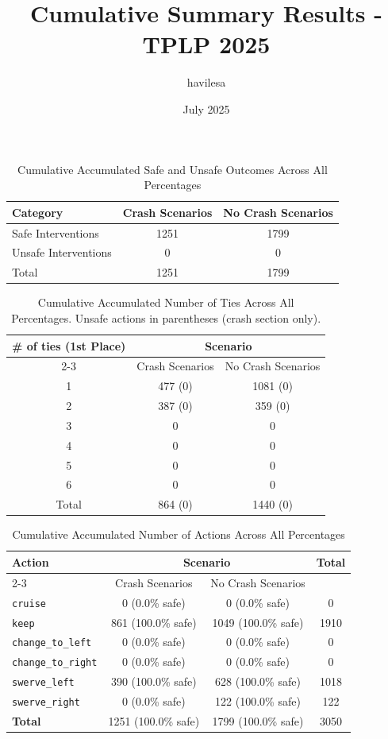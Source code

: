 \documentclass{article}
\title{Cumulative Summary Results - TPLP 2025}
\author{havilesa}
\date{July 2025}
\begin{document}
\maketitle

\begin{table}[h]
\centering
\caption{Cumulative Accumulated Safe and Unsafe Outcomes Across All Percentages}
\begin{tabular}{l|cc}
\toprule
Category & Crash Scenarios & No Crash Scenarios \\
\midrule
Safe Interventions & 1251 & 1799 \\ 
Unsafe Interventions & 0 & 0 \\ 
\midrule
Total & 1251 & 1799 \\ 
\bottomrule
\end{tabular}
\end{table}

\begin{table}[h]
\centering
\caption{Cumulative Accumulated Number of Ties Across All Percentages.
Unsafe actions in parentheses (crash section only).}
\begin{tabular}{c|cc}
\toprule
\multirow{2}{*}{\# of ties (1st Place)} & \multicolumn{2}{c|}{Scenario} \\
\cmidrule{2-3}
 & Crash Scenarios & No Crash Scenarios \\
\midrule
1 & 477 (0) & 1081 (0) \\ 
2 & 387 (0) & 359 (0) \\ 
3 & 0 & 0 \\ 
4 & 0 & 0 \\ 
5 & 0 & 0 \\ 
6 & 0 & 0 \\ 
\midrule
Total & 864 (0) & 1440 (0) \\ 
\bottomrule
\end{tabular}
\end{table}

\begin{table}[h]
\centering
\caption{Cumulative Accumulated Number of Actions Across All Percentages}
\begin{tabular}{l|cc|c}
\toprule
\multirow{2}{*}{Action} & \multicolumn{2}{c|}{Scenario} & \multirow{2}{*}{Total} \\
\cmidrule{2-3}
 & Crash Scenarios & No Crash Scenarios \\
\midrule
\texttt{cruise} & 0 (0.0\% safe) & 0 (0.0\% safe) & 0 \\ 
\texttt{keep} & 861 (100.0\% safe) & 1049 (100.0\% safe) & 1910 \\ 
\texttt{change\_to\_left} & 0 (0.0\% safe) & 0 (0.0\% safe) & 0 \\ 
\texttt{change\_to\_right} & 0 (0.0\% safe) & 0 (0.0\% safe) & 0 \\ 
\texttt{swerve\_left} & 390 (100.0\% safe) & 628 (100.0\% safe) & 1018 \\ 
\texttt{swerve\_right} & 0 (0.0\% safe) & 122 (100.0\% safe) & 122 \\ 
\midrule
\textbf{Total} & 1251 (100.0\% safe) & 1799 (100.0\% safe) & 3050 \\ 
\bottomrule
\end{tabular}
\end{table}
\end{document}
